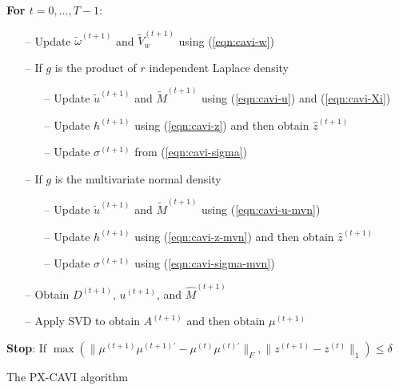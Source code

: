 \documentclass[pdftex, noinfoline, letter]{imsart}
\theoremstyle{plain}
\begin{document}
\begin{algorithm}[ht]
\DontPrintSemicolon
   \vspace{0.1cm}
   
   \vspace{0.1cm}
   
     \vspace{0.1cm}
     
{\bf For $t = 0, \dots, T-1$}:

  \begin{itemize}
  \item[--] Update $\widetilde  \omega^{(t+1)}$ and $\widetilde  V_w^{(t+1)}$ using (\ref{eqn:cavi-w})
  \item[--] If $g$ is the product of $r$ independent Laplace density
  \begin{itemize}
  	\item[--] Update $ \widetilde  u^{(t+1)}$ and $\widetilde {M}^{(t+1)}$ using (\ref{eqn:cavi-u}) and (\ref{eqn:cavi-Xi}) 
	  \item[--] Update $ h^{(t+1)}$ using (\ref{eqn:cavi-z}) and then obtain 
  $\widehat  z^{(t+1)}$
  \item[--] Update $\sigma^{(t+1)}$ from (\ref{eqn:cavi-sigma}) 
\end{itemize}
\item[--] If $g$ is the multivariate normal density
  \begin{itemize}
  \item[--] Update $\widetilde  u^{(t+1)}$ and $\widetilde {M}^{(t+1)}$ using (\ref{eqn:cavi-u-mvn})
  \item[--] Update $ h^{(t+1)}$ using (\ref{eqn:cavi-z-mvn}) and then obtain 
  $\widehat  z^{(t+1)}$
  \item[--] Update $\sigma^{(t+1)}$ using (\ref{eqn:cavi-sigma-mvn})
  \end{itemize}
    \item[--] Obtain $D^{(t+1)}$, $u^{(t+1)}$, and $\widehat  M^{(t+1)}$
  \item[--] Apply SVD to obtain $A^{(t+1)}$ and then obtain $\mu^{(t+1)}$
\end{itemize}
   \vspace{0.1cm}
   
{\bf Stop}: If $\max\left(\big\|\mu^{(t+1)} \mu^{{(t+1)}'} - \mu^{(t)} \mu^{{(t)}'}\big\|_F, \| z^{(t+1)} -z^{(t)}\|_1\right) \leq \delta$
   
    \vspace{0.1cm}
    
\caption{The PX-CAVI algorithm}
\label{px-cavi}
\end{algorithm} 
\end{document}
